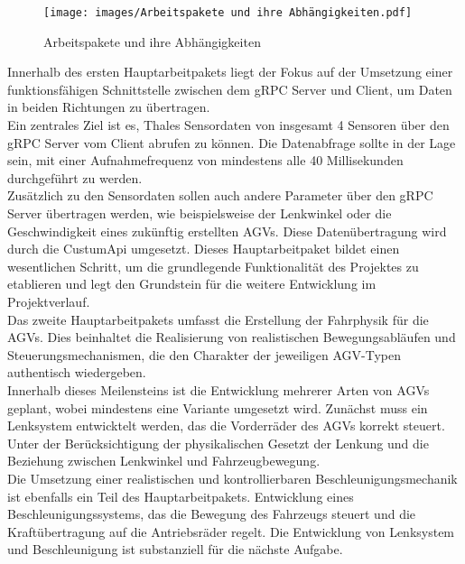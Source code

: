 \begin{figure}[h]
    \centering
    \texttt{[image: images/Arbeitspakete und ihre Abhängigkeiten.pdf]}
    \caption{Arbeitspakete und ihre Abhängigkeiten}
    \label{fig:Arbeitspakete}
\end{figure}
Innerhalb des ersten Hauptarbeitpakets liegt der Fokus auf der Umsetzung einer funktionsfähigen Schnittstelle zwischen dem gRPC Server und Client, um Daten in beiden Richtungen zu übertragen. \\
Ein zentrales Ziel ist es, Thales Sensordaten von insgesamt 4 Sensoren über den gRPC Server vom Client abrufen zu können. Die Datenabfrage sollte in der Lage sein, mit einer Aufnahmefrequenz von mindestens alle 40 Millisekunden durchgeführt zu werden.\\
Zusätzlich zu den Sensordaten sollen auch andere Parameter über den gRPC Server übertragen werden, wie beispielsweise der Lenkwinkel oder die Geschwindigkeit eines zukünftig erstellten AGVs. Diese Datenübertragung wird durch die CustumApi umgesetzt. Dieses Hauptarbeitpaket bildet einen wesentlichen Schritt, um die grundlegende Funktionalität des Projektes zu etablieren und legt den Grundstein für die weitere Entwicklung im Projektverlauf.\\
Das zweite Hauptarbeitpakets umfasst die Erstellung der Fahrphysik für die AGVs. Dies beinhaltet die Realisierung von realistischen Bewegungsabläufen und Steuerungsmechanismen, die den Charakter der jeweiligen AGV-Typen authentisch wiedergeben.\\
Innerhalb dieses Meilensteins ist die Entwicklung mehrerer Arten von AGVs geplant, wobei mindestens eine Variante umgesetzt wird. Zunächst muss ein Lenksystem entwicktelt werden, das die Vorderräder des AGVs korrekt steuert. Unter der Berücksichtigung der physikalischen Gesetzt der Lenkung und die Beziehung zwischen Lenkwinkel und Fahrzeugbewegung.\\
Die Umsetzung einer realistischen und kontrollierbaren Beschleunigungsmechanik ist ebenfalls ein Teil des Hauptarbeitpakets. Entwicklung eines Beschleunigungssystems, das die Bewegung des Fahrzeugs steuert und die Kraftübertragung auf die Antriebsräder regelt. Die Entwicklung von Lenksystem und Beschleunigung ist substanziell für die nächste Aufgabe.\\

